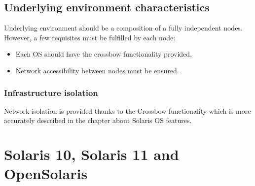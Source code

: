 \documentclass[11pt]{book}
\begin{document}
    \section{Underlying environment characteristics}

      Underlying environment should be a composition of a fully independent nodes. However, a few requisites must be
      fulfilled by each node:

      \begin{itemize}
        \item Each OS should have the crossbow functionality provided,
        \item Network accessibility between nodes must be ensured.
      \end{itemize}


	

      \subsection{Infrastructure isolation}

        Network isolation is provided thanks to the Crossbow functionality which is more accurately described in the
        chapter about Solaris OS features.




  \chapter{Solaris 10, Solaris 11 and OpenSolaris}
  \label{chap:sol}
  
\end{document}
